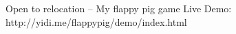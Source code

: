 \documentclass{resume} %
\begin{document}








Open to relocation -- My flappy pig game Live Demo: http://yidi.me/flappypig/demo/index.html \\
\end{document}

